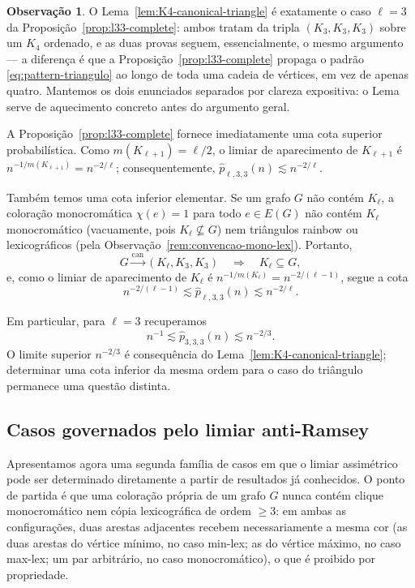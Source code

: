 \documentclass[reqno, 12pt]{amsart}
\numberwithin{equation}{section}
\theoremstyle{plain}
\theoremstyle{definition}
\newtheorem{remark}[theorem]{Observação}
\begin{document}
\begin{remark}
  O Lema~\ref{lem:K4-canonical-triangle} é exatamente o caso
  $\ell=3$ da Proposição~\ref{prop:l33-complete}: ambos tratam da
  tripla $(K_3,K_3,K_3)$ sobre um $K_4$ ordenado, e as duas provas
  seguem, essencialmente, o mesmo argumento — a diferença é que a
  Proposição~\ref{prop:l33-complete} propaga o padrão
  \eqref{eq:pattern-triangulo} ao longo de toda uma cadeia de
  vértices, em vez de apenas quatro. Mantemos os dois enunciados
  separados por clareza expositiva: o Lema serve de aquecimento
  concreto antes do argumento geral.
\end{remark}

A Proposição~\ref{prop:l33-complete} fornece imediatamente uma cota
superior probabilística. Como $m(K_{\ell+1})=\ell/2$, o limiar de
aparecimento de $K_{\ell+1}$ é $n^{-1/m(K_{\ell+1})}=n^{-2/\ell}$;
consequentemente, $\widehat p_{\ell,3,3}(n)\lesssim n^{-2/\ell}$.

Também temos uma cota inferior elementar. Se um grafo $G$ não
contém $K_\ell$, a coloração monocromática $\chi(e)=1$ para todo
$e\in E(G)$ não contém $K_\ell$ monocromático (vacuamente, pois
$K_\ell\not\subseteq G$) nem triângulos rainbow ou lexicográficos
(pela Observação~\ref{rem:convencao-mono-lex}). Portanto,
\[
  G\xrightarrow{\mathrm{can}}(K_\ell,K_3,K_3)
  \quad\Longrightarrow\quad
  K_\ell\subseteq G,
\]
e, como o limiar de aparecimento de $K_\ell$ é
$n^{-1/m(K_\ell)}=n^{-2/(\ell-1)}$, segue a cota
\[
  n^{-2/(\ell-1)}
  \lesssim
  \widehat p_{\ell,3,3}(n)
  \lesssim
  n^{-2/\ell}.
\]

Em particular, para $\ell=3$ recuperamos
\[
  n^{-1}
  \lesssim
  \widehat p_{3,3,3}(n)
  \lesssim
  n^{-2/3}.
\]
O limite superior $n^{-2/3}$ é consequência do
Lema~\ref{lem:K4-canonical-triangle}; determinar uma cota inferior
da mesma ordem para o caso do triângulo permanece uma questão
distinta.

\subsection{Casos governados pelo limiar anti-Ramsey}

Apresentamos agora uma segunda família de casos em que o limiar
assimétrico pode ser determinado diretamente a partir de resultados
já conhecidos. O ponto de partida é que uma coloração própria de um
grafo $G$ nunca contém clique monocromático nem cópia lexicográfica
de ordem $\geq3$: em ambas as configurações, duas arestas adjacentes
recebem necessariamente a mesma cor (as duas arestas do vértice
mínimo, no caso min-lex; as do vértice máximo, no caso max-lex; um
par arbitrário, no caso monocromático), o que é proibido por
propriedade.
\end{document}
